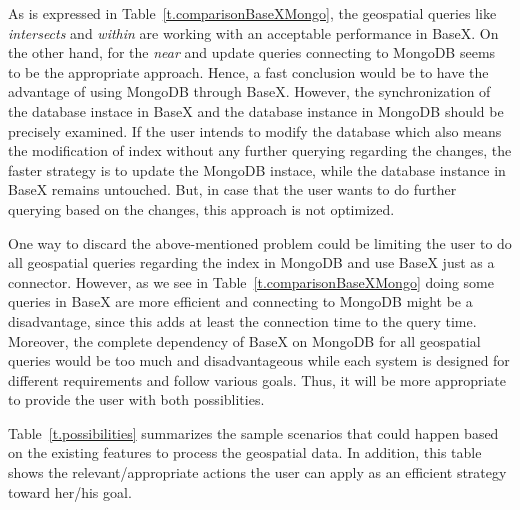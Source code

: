 \documentclass[a4paper,12pt]{article}
\begin{document}
As is expressed in Table~\ref{t.comparisonBaseXMongo}, the geospatial queries like \textit{intersects} and \textit{within} are working with an acceptable performance in BaseX. On the other hand, for the \textit{near} and update queries connecting to MongoDB seems to be the appropriate approach. Hence, a fast conclusion would be to have the advantage of using MongoDB through BaseX. However, the synchronization of the database instace in BaseX and the database instance in MongoDB should be precisely examined. If the user intends to modify the database which also means the modification of index without any further querying regarding the changes, the faster strategy is to update the MongoDB instace, while the database instance in BaseX remains untouched. But, in case that the user wants to do further querying based on the changes, this approach is not optimized.  

One way to discard the above-mentioned problem could be limiting the user to do all geospatial queries regarding the index in MongoDB and use BaseX just as a connector. 
However, as we see in Table~\ref{t.comparisonBaseXMongo} doing some queries in BaseX are more efficient and connecting to MongoDB might be a disadvantage, since this adds at least the connection time to the query time. Moreover, the complete dependency of BaseX on MongoDB for all geospatial queries would be too much and disadvantageous while each system is designed for different requirements and follow various goals. 
Thus, it will be more appropriate to provide the user with both possiblities.

Table~\ref{t.possibilities} summarizes the sample scenarios that could happen based on the existing features to process the geospatial data. In addition, this table shows the relevant/appropriate actions the user can apply as an efficient strategy toward her/his goal.


\begin{table}
\centering
{}
\caption{Possible scenarios and appropriate actions suggested to take}
\label{t.possibilities}
\end{table}
\end{document}

